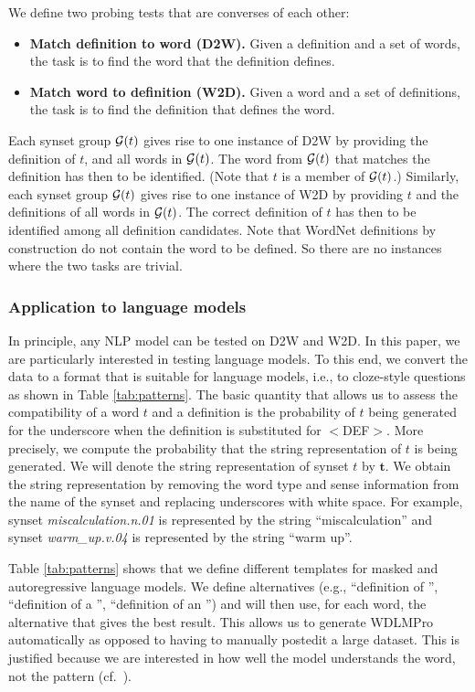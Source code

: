 \documentclass[11pt,a4paper]{article}
\begin{document}
We define two probing tests that are converses of each other:
\begin{itemize}
  \item \textbf{Match definition to word (D2W).} Given a
    definition and a set of words, the task is to find the
    word that the definition defines.
  \item \textbf{Match word to definition (W2D).} Given a
    word and a set of definitions, the task is to find the
    definition that defines the word.
    \end{itemize}
Each synset group ${\cal G}(t)$ gives rise to one instance
of D2W by providing the definition of $t$, and all words in
${\cal G}(t)$. The word from ${\cal G}(t)$ that matches the
definition has then to be identified. (Note that $t$ is a
member of ${\cal G}(t)$.)
Similarly, each synset group ${\cal G}(t)$ gives rise to one instance
of W2D by providing $t$ and the definitions of all words in
${\cal G}(t)$. The
correct definition  of $t$ has then to be identified among
all definition  candidates. Note that WordNet definitions by
construction do not contain the word to be defined. So there
are no instances where the two tasks are trivial.

\subsubsection{Application to language models}
In principle, any NLP model can be tested on D2W and W2D.
In this paper, we are particularly
interested in testing language models. To this end, we 
convert the data to a format that is suitable for language
models, i.e., to cloze-style questions as
shown in Table
\ref{tab:patterns}. The basic quantity that allows us to
assess the compatibility of a word $t$ and a definition is the
probability of
$t$ being generated for 
the underscore when the definition is substituted for $<$DEF$>$.
More precisely, we compute the probability that the string
representation of $t$ is being generated.
We will denote the string representation of synset $t$ by
$\bm{t}$. 
We obtain the string representation by removing
the word type and sense information from the name of the
synset and replacing underscores with white space. For
example, synset \emph{miscalculation.n.01} is represented by
the string ``miscalculation'' and synset
\emph{warm\_up.v.04} is represented by the string ``warm
up''.

Table
\ref{tab:patterns}
shows
that we define different templates for masked
and autoregressive language models. We define alternatives
(e.g., ``definition of \underline{\hspace{3mm}}'', 
``definition of a \underline{\hspace{3mm}}'', 
``definition of an \underline{\hspace{3mm}}'') and will then
use, for each word, the alternative that gives the best
result. This allows us to generate  WDLMPro automatically as
opposed to having to manually postedit a large dataset.
This is justified because we are interested in
how well the model understands the word, not the pattern (cf.\  ). 
\end{document}

